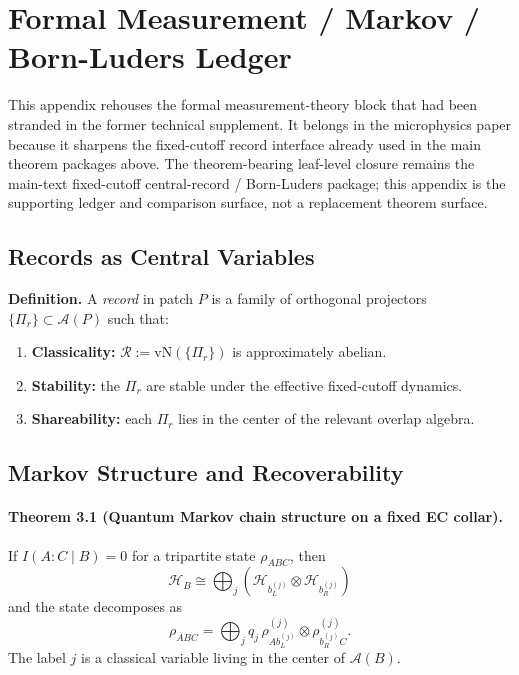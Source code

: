 \section{Formal Measurement / Markov / Born-Luders Ledger}
\label{app:microphysics-measurement-ledger}

This appendix rehouses the formal measurement-theory block that had been stranded in the former
technical supplement. It belongs in the microphysics paper because it sharpens the fixed-cutoff
record interface already used in the main theorem packages above. The theorem-bearing leaf-level
closure remains the main-text fixed-cutoff central-record / Born-Luders package; this appendix is
the supporting ledger and comparison surface, not a replacement theorem surface.

\subsection{Records as Central Variables}

\textbf{Definition.} A \emph{record} in patch \(P\) is a family of orthogonal projectors
\(\{\Pi_r\}\subset\mathcal A(P)\) such that:
\begin{enumerate}[leftmargin=2em]
\item \textbf{Classicality:} \(\mathcal R:=\mathrm{vN}(\{\Pi_r\})\) is approximately abelian.
\item \textbf{Stability:} the \(\Pi_r\) are stable under the effective fixed-cutoff dynamics.
\item \textbf{Shareability:} each \(\Pi_r\) lies in the center of the relevant overlap algebra.
\end{enumerate}

\subsection{Markov Structure and Recoverability}

\paragraph{\textbf{Theorem 3.1 (Quantum Markov chain structure on a fixed EC collar).}}
If \(I(A:C\mid B)=0\) for a tripartite state \(\rho_{ABC}\), then
\[
\mathcal H_B
\cong
\bigoplus_j
\left(
\mathcal H_{b_L^{(j)}}\otimes \mathcal H_{b_R^{(j)}}
\right)
\]
and the state decomposes as
\[
\rho_{ABC}
=
\bigoplus_j
q_j\,
\rho^{(j)}_{A b_L^{(j)}}\otimes \rho^{(j)}_{b_R^{(j)} C}.
\]
The label \(j\) is a classical variable living in the center of \(\mathcal A(B)\).

